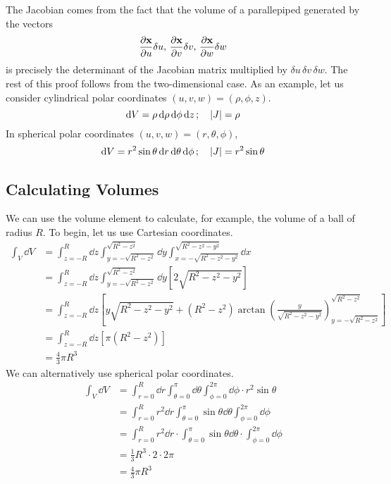 \noindent The Jacobian comes from the fact that the volume of a parallepiped generated by the vectors
\[
	\frac{\partial \vb x}{\partial u} \delta u,\,\frac{\partial \vb x}{\partial v} \delta v,\,\frac{\partial \vb x}{\partial w} \delta w
\]
is precisely the determinant of the Jacobian matrix multiplied by \(\delta u\,\delta v\,\delta w\).
The rest of this proof follows from the two-dimensional case.
As an example, let us consider cylindrical polar coordinates \((u, v, w) = (\rho, \phi, z)\).
\[
	\dd{V} = \rho \dd{\rho} \dd{\phi} \dd{z};\quad \abs{J} = \rho
\]
In spherical polar coordinates \((u, v, w) = (r, \theta, \phi)\),
\[
	\dd{V} = r^2 \sin\theta \dd{r} \dd{\theta} \dd{\phi};\quad \abs{J} = r^2\sin\theta
\]

\subsection{Calculating Volumes}
We can use the volume element to calculate, for example, the volume of a ball of radius \(R\).
To begin, let us use Cartesian coordinates.
\begin{align*}
	\int_V \dd{V} & = \int_{z=-R}^R \dd{z} \int_{y = -\sqrt{R^2 - z^2}}^{\sqrt{R^2 - z^2}} \dd{y} \int_{x = -\sqrt{R^2 - z^2 - y^2}}^{\sqrt{R^2 - z^2 - y^2}} \dd{x}                             \\
	              & = \int_{z=-R}^R \dd{z} \int_{y = -\sqrt{R^2 - z^2}}^{\sqrt{R^2 - z^2}} \dd{y} \left[ 2\sqrt{R^2 - z^2 - y^2} \right]                                                         \\
	              & = \int_{z=-R}^R \dd{z} \left[ y\sqrt{R^2 - z^2 - y^2} + (R^2 - z^2) \arctan \left( \frac{y}{\sqrt{R^2 - z^2 - y^2}} \right)_{y=-\sqrt{R^2 - z^2}}^{\sqrt{R^2 - z^2}} \right] \\
	              & = \int_{z=-R}^R \dd{z} \left[ \pi (R^2 - z^2) \right]                                                                                                                        \\
	              & = \frac{4}{3}\pi R^3
\end{align*}
We can alternatively use spherical polar coordinates.
\begin{align*}
	\int_V \dd{V} & = \int_{r=0}^R \dd{r} \int_{\theta=0}^\pi \dd{\theta} \int_{\phi=0}^{2\pi} \dd{\phi} \cdot r^2 \sin\theta     \\
	              & = \int_{r=0}^R r^2\dd{r} \int_{\theta=0}^\pi \sin\theta\dd{\theta} \int_{\phi=0}^{2\pi} \dd{\phi}             \\
	              & = \int_{r=0}^R r^2\dd{r} \cdot \int_{\theta=0}^\pi \sin\theta\dd{\theta} \cdot \int_{\phi=0}^{2\pi} \dd{\phi} \\
	              & = \frac{1}{3}R^3 \cdot 2 \cdot 2 \pi                                                                          \\
	              & = \frac{4}{3}\pi R^3
\end{align*}
